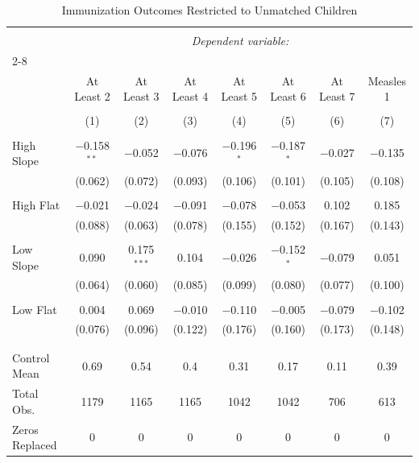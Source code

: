 
\begin{table}[!htbp] \centering 
  \caption{Immunization Outcomes Restricted to Unmatched Children} 
  \label{} 
\scriptsize 
\begin{tabular}{@{\extracolsep{0.25pt}}lccccccc} 
\\[-1.8ex]\hline 
\hline \\[-1.8ex] 
 & \multicolumn{7}{c}{\textit{Dependent variable:}} \\ 
\cline{2-8} 
\\[-1.8ex] & At Least 2 & At Least 3 & At Least 4 & At Least 5 & At Least 6 & At Least 7 & Measles 1 \\ 
\\[-1.8ex] & (1) & (2) & (3) & (4) & (5) & (6) & (7)\\ 
\hline \\[-1.8ex] 
 High Slope & $-$0.158$^{**}$ & $-$0.052 & $-$0.076 & $-$0.196$^{*}$ & $-$0.187$^{*}$ & $-$0.027 & $-$0.135 \\ 
  & (0.062) & (0.072) & (0.093) & (0.106) & (0.101) & (0.105) & (0.108) \\ 
  & & & & & & & \\ 
 High Flat & $-$0.021 & $-$0.024 & $-$0.091 & $-$0.078 & $-$0.053 & 0.102 & 0.185 \\ 
  & (0.088) & (0.063) & (0.078) & (0.155) & (0.152) & (0.167) & (0.143) \\ 
  & & & & & & & \\ 
 Low Slope & 0.090 & 0.175$^{***}$ & 0.104 & $-$0.026 & $-$0.152$^{*}$ & $-$0.079 & 0.051 \\ 
  & (0.064) & (0.060) & (0.085) & (0.099) & (0.080) & (0.077) & (0.100) \\ 
  & & & & & & & \\ 
 Low Flat & 0.004 & 0.069 & $-$0.010 & $-$0.110 & $-$0.005 & $-$0.079 & $-$0.102 \\ 
  & (0.076) & (0.096) & (0.122) & (0.176) & (0.160) & (0.173) & (0.148) \\ 
  & & & & & & & \\ 
\hline \\[-1.8ex] 
Control Mean & 0.69 & 0.54 & 0.4 & 0.31 & 0.17 & 0.11 & 0.39 \\ 
Total Obs. & 1179 & 1165 & 1165 & 1042 & 1042 & 706 & 613 \\ 
Zeros Replaced & 0 & 0 & 0 & 0 & 0 & 0 & 0 \\ 

\end{tabular}
\end{table}
